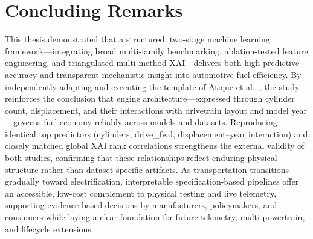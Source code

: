 \section{Concluding Remarks}

This thesis demonstrated that a structured, two-stage machine learning framework---integrating broad multi-family benchmarking, ablation-tested feature engineering, and triangulated multi-method XAI---delivers both high predictive accuracy and transparent mechanistic insight into automotive fuel efficiency. By independently adapting and executing the template of Atique et al.~\cite{atique2026explainable}, the study reinforces the conclusion that engine architecture---expressed through cylinder count, displacement, and their interactions with drivetrain layout and model year---governs fuel economy reliably across models and datasets. Reproducing identical top predictors (cylinders, drive\_fwd, displacement--year interaction) and closely matched global XAI rank correlations strengthens the external validity of both studies, confirming that these relationships reflect enduring physical structure rather than dataset-specific artifacts. As transportation transitions gradually toward electrification, interpretable specification-based pipelines offer an accessible, low-cost complement to physical testing and live telemetry, supporting evidence-based decisions by manufacturers, policymakers, and consumers while laying a clear foundation for future telemetry, multi-powertrain, and lifecycle extensions.
